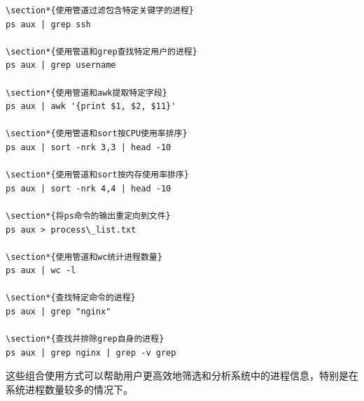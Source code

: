 \documentclass[12pt,UTF8]{ctexbook}
\begin{document}
\begin{verbatim}
\section*{使用管道过滤包含特定关键字的进程}
ps aux | grep ssh

\section*{使用管道和grep查找特定用户的进程}
ps aux | grep username

\section*{使用管道和awk提取特定字段}
ps aux | awk '{print $1, $2, $11}'

\section*{使用管道和sort按CPU使用率排序}
ps aux | sort -nrk 3,3 | head -10

\section*{使用管道和sort按内存使用率排序}
ps aux | sort -nrk 4,4 | head -10

\section*{将ps命令的输出重定向到文件}
ps aux > process\_list.txt

\section*{使用管道和wc统计进程数量}
ps aux | wc -l

\section*{查找特定命令的进程}
ps aux | grep "nginx"

\section*{查找并排除grep自身的进程}
ps aux | grep nginx | grep -v grep
\end{verbatim}

这些组合使用方式可以帮助用户更高效地筛选和分析系统中的进程信息，特别是在系统进程数量较多的情况下。
\end{document}
